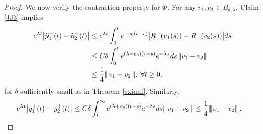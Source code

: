 \documentclass[12pt]{amsart}
\newcommand{\vertiii}[1]{{\left\vert\kern-0.25ex\left\vert\kern-0.25ex\left\vert #1 
    \right\vert\kern-0.25ex\right\vert\kern-0.25ex\right\vert}}
\begin{document}
\begin{proof}
We now verify the contraction property for $\Phi$. For any $v_1, v_2\in B_{\delta, \lambda}$, Claim \ref{JJ3} implies 
\begin{align*}
	e^{\lambda t}\bigl|\tilde y_1^-(t)-\tilde y_2^-(t)\bigr| &\le  e^{\lambda t}
	  \int_0^t e^{-e_0(t-s)}\bigl |R^-(v_1(s))-R^-(v_2(s))\bigr|ds \\
	&\le C\delta \int_0^t e^{(\lambda- e_0)(t-s)} e^{-\lambda s}ds \vertiii{v_1-v_2}\\
	&\le \frac 14\vertiii{v_1-v_2}, \; \forall t\ge0,
\end{align*}
for $\delta$ sufficiently small as in Theorem \ref{exiuni}. Similarly, 
\begin{align}
		e^{\lambda t}\bigl |\tilde y_1^+(t)-\tilde y_2^+(t)\bigr |&\le C\delta\int_t^{\infty}e^{(\lambda+e_0)(t-s)}e^{-\lambda s}ds\vertiii{v_1-v_2}\le \frac 14\vertiii{v_1-v_2}. \label{1009}
\end{align}


\end{proof}
\end{document}
